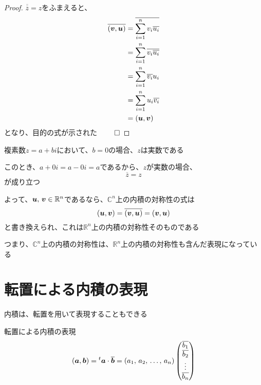 \documentclass[../../../topic_linear-algebra]{subfiles}
\begin{document}
\begin{proof}
  $\overline{\overline{z}} = z$をふまえると、
  \begin{align*}
    \overline{(\vb*{v}, \vb*{u})} & = \overline{\sum_{i=1}^n v_i \overline{u_i}} \\
                                  & = \sum_{i=1}^n \overline{v_i \overline{u_i}} \\
                                  & = \sum_{i=1}^n \overline{v_i} u_i            \\
                                  & = \sum_{i=1}^n u_i \overline{v_i}            \\
                                  & = (\vb*{u}, \vb*{v})
  \end{align*}
  となり、目的の式が示された $\qed$
\end{proof}

複素数$z=a+bi$において、$b=0$の場合、$z$は実数である

このとき、$a+0i = a-0i = a$であるから、$z$が実数の場合、
\begin{equation*}
  \overline{z} = z
\end{equation*}
が成り立つ

\br

よって、$\vb*{u},\,\vb*{v} \in \mathbb{R}^n$であるなら、$\mathbb{C}^n$上の内積の対称性の式は
\begin{equation*}
  (\vb*{u}, \vb*{v}) = \overline{(\vb*{v}, \vb*{u})} = (\vb*{v}, \vb*{u})
\end{equation*}
と書き換えられ、これは$\mathbb{R}^n$上の内積の対称性そのものである

\br

つまり、$\mathbb{C}^n$上の内積の対称性は、$\mathbb{R}^n$上の内積の対称性も含んだ表現になっている

\sectionline
\section{転置による内積の表現}

内積は、転置を用いて表現することもできる

\begin{theorem}{転置による内積の表現}\label{thm:inner-product-as-transpose-product}
  \begin{equation*}
    (\vb*{a},\vb*{b}) = {}^t \vb*{a} \cdot \overline{\vb*{b}} = \left(a_1,\,a_2,\,\ldots,\,a_n\right) \begin{pmatrix}
      \overline{b_1} \\
      \overline{b_2} \\
      \vdots         \\
      \overline{b_n}
    \end{pmatrix}
  \end{equation*}
\end{theorem}
\end{document}
